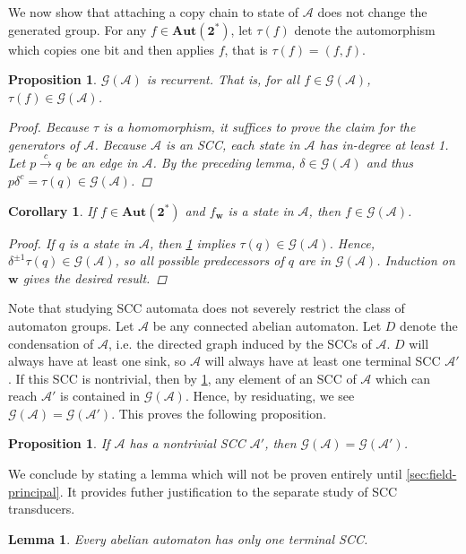 \documentclass[12pt, letterpaper]{article}
\newcommand{\bin}{\mathbf 2}
\newcommand{\A}{\mathcal A}
\newcommand{\ch}[1]{\mathbf{#1}}
\newcommand{\res}[2]{{{#1}_{\ch{#2}}}}
\newcommand{\Aut}{\mathbf{Aut}}
\newcommand{\gp}{\mathcal G}
\newtheorem{lemma}[thm]{Lemma}
\newtheorem{cor}[thm]{Corollary}
\newtheorem{prop}[thm]{Proposition}
\begin{document}
We now show that attaching a copy chain to state of $\A$ does not change the
generated group.  For any $f \in \Aut(\bin^*)$, let $\tau(f)$ denote the
automorphism which copies one bit and then applies $f$, that is
$\tau(f) = (f, f)$.
\begin{prop}\label{prop:recurrent}
    $\gp(\A)$ is recurrent. That is, for all $f \in \gp(\A)$,
    $\tau(f) \in \gp(\A)$.
    \begin{proof}
        Because $\tau$ is a homomorphism, it suffices to prove the claim for
        the generators of $\A$. Because $\A$ is an SCC, each state in $\A$ has
        in-degree at least 1. Let $p \xrightarrow{c} q$ be an edge in $\A$.  By
        the preceding lemma, $\delta \in \gp(\A)$ and thus $p \delta^c =
        \tau(q) \in \gp(\A)$.
    \end{proof}
\end{prop}

\begin{cor}\label{cor:back-residuals}
    If $f \in \Aut(\bin^*)$ and $\res{f}{w}$ is a state in $\A$, then
    $f \in \gp(\A)$.
    \begin{proof}
        If $q$ is a state in $\A$, then \cref{prop:recurrent} implies
        $\tau(q) \in \gp(\A)$. Hence, $\delta^{\pm 1} \tau(q) \in \gp(\A)$,
        so all possible predecessors of $q$ are in $\gp(\A)$. Induction
        on $\ch{w}$ gives the desired result.
    \end{proof}
\end{cor}

Note that studying SCC automata does not severely restrict the class of
automaton groups. Let $\A$ be any connected abelian automaton. Let $D$ denote
the condensation of $\A$, i.e. the directed graph induced by the SCCs of $\A$.
$D$ will always have at least one sink, so $\A$ will always have at least one
terminal SCC $\A'$. If this SCC is nontrivial, then by
\cref{cor:back-residuals}, any element of an SCC of $\A$ which can reach $\A'$
is contained in $\gp(\A)$. Hence, by residuating, we see $\gp(\A) = \gp(\A')$.
This proves the following proposition.
\begin{prop}\label{prop:generated-by-terminal}
    If $\A$ has a nontrivial SCC $\A'$, then $\gp(\A) = \gp(\A')$.
\end{prop}

We conclude by stating a lemma which will not be proven entirely until
\cref{sec:field-principal}. It provides futher justification to the separate
study of SCC transducers.
\begin{lemma}\label{lemma:one-terminal-scc}
    Every abelian automaton has only one terminal SCC.
\end{lemma}
\end{document}
